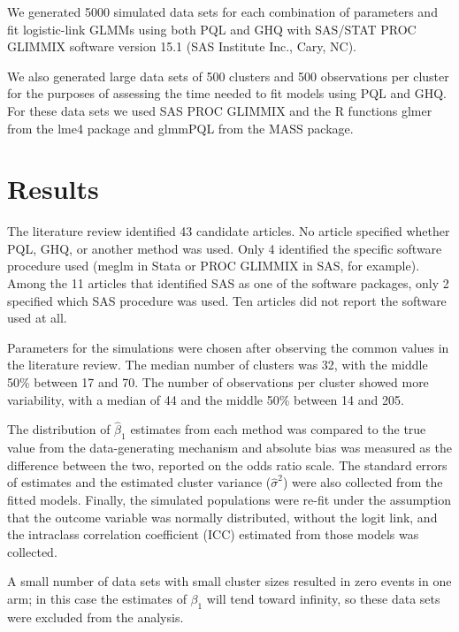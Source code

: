 \documentclass[Afour,times,sagev,doublespace]{sagej}
\begin{document}
We generated 5000 simulated data sets for each combination of parameters and fit logistic-link GLMMs using both PQL and GHQ with SAS/STAT PROC GLIMMIX software version 15.1 (SAS Institute Inc., Cary, NC).

We also generated large data sets of 500 clusters and 500 observations per cluster for the purposes of assessing the time needed to fit models using PQL and GHQ.  For these data sets we used SAS PROC GLIMMIX and the R functions glmer from the lme4 package and glmmPQL from the MASS package.






\section{Results}

The literature review identified 43 candidate articles. No article specified whether PQL, GHQ, or another method was used.  Only 4 identified the specific software procedure used (meglm in Stata or PROC GLIMMIX in SAS, for example). Among the 11 articles that identified SAS as one of the software packages, only 2 specified which SAS procedure was used. Ten articles did not report the software used at all.

Parameters for the simulations were chosen after observing the common values in the literature review. The median number of clusters was 32, with the middle 50\% between 17 and 70. The number of observations per cluster showed more variability, with a median of 44 and the middle 50\% between 14 and 205.


The distribution of $\hat{\beta}_1$ estimates from each method was compared to the true value from the data-generating mechanism and absolute bias was measured as the difference between the two, reported on the odds ratio scale. The standard errors of estimates and the estimated cluster variance ($\hat{\sigma}^2$) were also collected from the fitted models. Finally, the simulated populations were re-fit under the assumption that the outcome variable was normally distributed, without the logit link, and the intraclass correlation coefficient (ICC) estimated from those models was collected.

A small number of data sets with small cluster sizes resulted in zero events in one arm; in this case the estimates of $\beta_1$ will tend toward infinity, so these data sets were excluded from the analysis.
\end{document}
